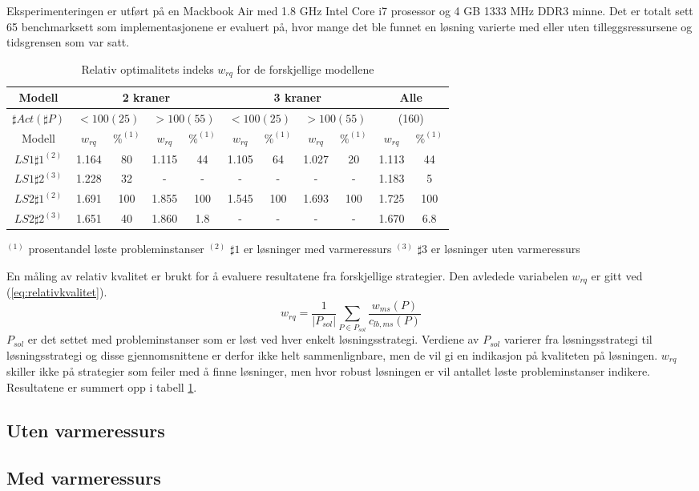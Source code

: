 Eksperimenteringen er utført på en Mackbook Air med 1.8 GHz Intel Core i7 prosessor og 4 GB 1333 MHz DDR3 minne. Det er totalt sett 65 benchmarksett som implementasjonene er evaluert på, hvor mange det ble funnet en løsning varierte med eller uten tilleggsressursene og tidsgrensen som var satt.

\begin{table}[h]
\begin{center}
\begin{tabular}{ | c | c | c | c | c | c | c | c | c | c | c | }
\hline
\textbf{Modell} & \multicolumn{4}{|c|}{\textbf{2 kraner}} & \multicolumn{4}{|c|}{\textbf{3 kraner}} & \multicolumn{2}{|c|}{\textbf{Alle}} \\ \hline
$\sharp Act(\sharp P)$ & \multicolumn{2}{|c|}{$< 100 (25)$} & \multicolumn{2}{|c|}{$> 100 (55)$} & \multicolumn{2}{|c|}{$< 100 (25)$} & \multicolumn{2}{|c|}{$> 100 (55)$} & \multicolumn{2}{|c|}{(160)} \\ 
\hline
Modell & $w_{rq}$ & $\%^{(1)}$ & $w_{rq}$ & $\%^{(1)}$  & $w_{rq}$ & $\%^{(1)}$ & $w_{rq}$ & $\%^{(1)}$ & $w_{rq}$ & $\%^{(1)}$ \\ \hline
$LS1 \sharp 1^{(2)}$ & 1.164 & 80 & 1.115 & 44 & 1.105 & 64 & 1.027 & 20 & 1.113 & 44 \\
$LS1 \sharp 2^{(3)}$ & 1.228 & 32 & - & - & - & - & - & - & 1.183 & 5 \\
$LS2 \sharp 1^{(2)}$ & 1.691 & 100 & 1.855 & 100 & 1.545 & 100 & 1.693 & 100 & 1.725 & 100 \\
$LS2 \sharp 2^{(3)}$ & 1.651 & 40 & 1.860 & 1.8 & - & - & - & - & 1.670 & 6.8 \\
\hline
\end{tabular}
\end{center}
\caption{Relativ optimalitets indeks $w_{rq}$ for de forskjellige modellene}
\label{tab:resultaterSum}
\end{table}
$^{(1)}$ prosentandel løste probleminstanser
$^{(2)}$ $\sharp 1$ er løsninger med varmeressurs
$^{(3)}$ $\sharp 3$ er løsninger uten varmeressurs

En måling av relativ kvalitet er brukt for å evaluere resultatene fra forskjellige strategier. Den avledede variabelen $w_{rq}$ er gitt ved (\ref{eq:relativkvalitet}).
\begin{equation}
w_{rq} = \frac{1}{| P_{sol} |} \sum_{P \in P_{sol}} \frac{w_{ms}(P)}{c_{lb,ms}(P)}
\label{eq:relativkvalitet}
\end{equation}
$P_{sol}$ er det settet med probleminstanser som er løst ved hver enkelt løsningsstrategi. Verdiene av $P_{sol}$ varierer fra løsningsstrategi til løsningsstrategi og disse gjennomsnittene er derfor ikke helt sammenlignbare, men de vil gi en indikasjon på kvaliteten på løsningen. $w_{rq}$ skiller ikke på strategier som feiler med å finne løsninger, men hvor robust løsningen er vil antallet løste probleminstanser indikere. Resultatene er summert opp i tabell \ref{tab:resultaterSum}.

\subsection{Uten varmeressurs}


\subsection{Med varmeressurs}
